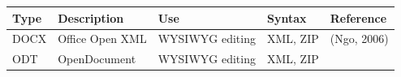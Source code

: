 \documentclass[10pt,fleqn]{wlpeerj}
\begin{document}
\begin{longtable}[c]{@{}lllll@{}}
\toprule
\begin{minipage}[b]{0.06\columnwidth}\raggedright\strut
\textbf{Type}
\strut\end{minipage} &
\begin{minipage}[b]{0.18\columnwidth}\raggedright\strut
\textbf{Description}
\strut\end{minipage} &
\begin{minipage}[b]{0.13\columnwidth}\raggedright\strut
\textbf{Use}
\strut\end{minipage} &
\begin{minipage}[b]{0.09\columnwidth}\raggedright\strut
\textbf{Syntax}
\strut\end{minipage} &
\begin{minipage}[b]{0.40\columnwidth}\raggedright\strut
\textbf{Reference}
\strut\end{minipage}\tabularnewline
\midrule
\endhead
\begin{minipage}[t]{0.06\columnwidth}\raggedright\strut
DOCX
\strut\end{minipage} &
\begin{minipage}[t]{0.18\columnwidth}\raggedright\strut
Office Open XML
\strut\end{minipage} &
\begin{minipage}[t]{0.13\columnwidth}\raggedright\strut
WYSIWYG editing
\strut\end{minipage} &
\begin{minipage}[t]{0.09\columnwidth}\raggedright\strut
XML, ZIP
\strut\end{minipage} &
\begin{minipage}[t]{0.40\columnwidth}\raggedright\strut
(Ngo, 2006)
\strut\end{minipage}\tabularnewline
\begin{minipage}[t]{0.06\columnwidth}\raggedright\strut
ODT
\strut\end{minipage} &
\begin{minipage}[t]{0.18\columnwidth}\raggedright\strut
OpenDocument
\strut\end{minipage} &
\begin{minipage}[t]{0.13\columnwidth}\raggedright\strut
WYSIWYG editing
\strut\end{minipage} &
\begin{minipage}[t]{0.09\columnwidth}\raggedright\strut
XML, ZIP
\strut\end{minipage} &
\begin{minipage}[t]{0.40\columnwidth}\raggedright\strut

\end{minipage}
\end{longtable}
\end{document}
